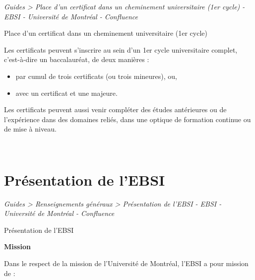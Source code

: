 \documentclass [12 pt]{article}
\begin{document}
        
        
        \textit{
        Guides > Place d'un certificat dans un cheminement universitaire (1er cycle)
            - EBSI - Université de Montréal - Confluence
        }
    
        Place d'un certificat dans un cheminement universitaire (1er cycle)
        
            Les certificats peuvent s'inscrire au sein d'un 1er cycle universitaire
                complet, c'est-à-dire un baccalauréat, de deux manières :
            
        \begin{itemize}
        
                
        \item par cumul de trois certificats (ou trois mineures), ou,
                
        \item avec un certificat et une majeure.
            
        \end{itemize}
    
            Les certificats peuvent aussi venir compléter des études antérieures ou de
                l'expérience dans des domaines reliés, dans une optique de formation continue ou de
                mise à niveau.
            
                
                    
                
            
             
        
    
    
        \newpage
        \section {
        Présentation de l'EBSI
        }
        
        
        
        \textit{
        Guides > Renseignements généraux > Présentation de l'EBSI - EBSI -
            Université de Montréal - Confluence
        }
    
        Présentation de l'EBSI
        
            
        \textbf{
        Mission
        }
    
            Dans le respect de la mission de l'Université de Montréal, l'EBSI a pour mission de
                :
            
\end{document}
